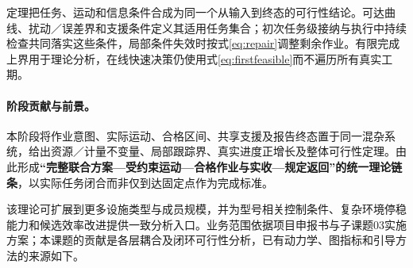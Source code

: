 \documentclass[UTF8,fontset=fandol,a4paper,11pt]{ctexart}
\begin{document}
定理把任务、运动和信息条件合成为同一个从输入到终态的可行性结论。可达曲线、扰动／误差界和支援条件定义其适用任务集合；初次任务级接纳与执行中持续检查共同落实这些条件，局部条件失效时按式\eqref{eq:repair}调整剩余作业。有限完成上界用于理论分析，在线快速决策仍使用式\eqref{eq:firstfeasible}而不遍历所有真实工期。

\paragraph{阶段贡献与前景。}
本阶段将作业意图、实际运动、合格区间、共享支援及报告终态置于同一混杂系统，给出资源／计量不变量、局部跟踪界、真实进度正增长及整体可行性定理。由此形成\textbf{“完整联合方案—受约束运动—合格作业与实收—规定返回”的统一理论链条}，以实际任务闭合而非仅到达固定点作为完成标准。

该理论可扩展到更多设施类型与成员规模，并为型号相关控制条件、复杂环境停稳能力和候选效率改进提供一致分析入口。业务范围依据项目申报书与子课题03实施方案；本课题的贡献是各层耦合及闭环可行性分析，已有动力学、图指标和引导方法的来源如下。
\end{document}
